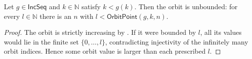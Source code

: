 \begin{lemma}
Let $g\in\mathsf{IncSeq}$ and $k\in\mathbb N$ satisfy $k<g(k)$.  Then the
orbit is unbounded: for every $l\in\mathbb N$ there is an $n$ with
$l<\mathsf{OrbitPoint}(g,k,n)$.
\end{lemma}
\begin{proof}
The orbit is strictly increasing by .  If it were
bounded by $l$, all its values would lie in the finite set
$\{0,\ldots,l\}$, contradicting injectivity of the infinitely many orbit
indices.  Hence some orbit value is larger than each prescribed $l$.
\end{proof}

